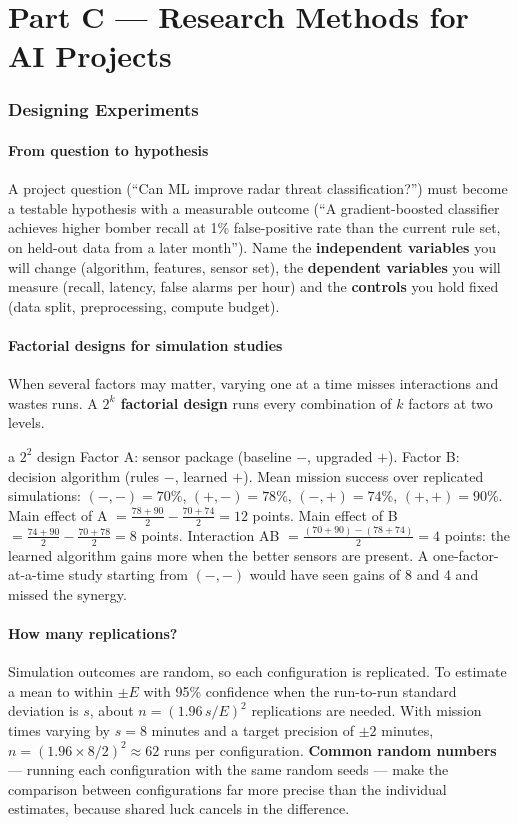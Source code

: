 \documentclass[11pt]{article}
\begin{document}
\part*{Part C --- Research Methods for AI Projects}

\section{Designing Experiments}
\subsection{From question to hypothesis}
A project question (``Can ML improve radar threat classification?'') must become a testable hypothesis with a measurable outcome (``A gradient-boosted classifier achieves higher bomber recall at 1\% false-positive rate than the current rule set, on held-out data from a later month''). Name the \textbf{independent variables} you will change (algorithm, features, sensor set), the \textbf{dependent variables} you will measure (recall, latency, false alarms per hour) and the \textbf{controls} you hold fixed (data split, preprocessing, compute budget).
\subsection{Factorial designs for simulation studies}
When several factors may matter, varying one at a time misses interactions and wastes runs. A \textbf{$2^k$ factorial design} runs every combination of $k$ factors at two levels.
\begin{example}{a $2^2$ design}
Factor A: sensor package (baseline $-$, upgraded $+$). Factor B: decision algorithm (rules $-$, learned $+$). Mean mission success over replicated simulations: $(-,-)=70\%$, $(+,-)=78\%$, $(-,+)=74\%$, $(+,+)=90\%$.\\
Main effect of A $=\frac{78+90}{2}-\frac{70+74}{2}=12$ points. Main effect of B $=\frac{74+90}{2}-\frac{70+78}{2}=8$ points. Interaction AB $=\frac{(70+90)-(78+74)}{2}=4$ points: the learned algorithm gains more when the better sensors are present. A one-factor-at-a-time study starting from $(-,-)$ would have seen gains of 8 and 4 and missed the synergy.
\end{example}
\subsection{How many replications?}
Simulation outcomes are random, so each configuration is replicated. To estimate a mean to within $\pm E$ with 95\% confidence when the run-to-run standard deviation is $s$, about $n=(1.96\,s/E)^2$ replications are needed. With mission times varying by $s=8$ minutes and a target precision of $\pm2$ minutes, $n=(1.96\times8/2)^2\approx62$ runs per configuration. \textbf{Common random numbers} --- running each configuration with the same random seeds --- make the comparison between configurations far more precise than the individual estimates, because shared luck cancels in the difference.
\end{document}
